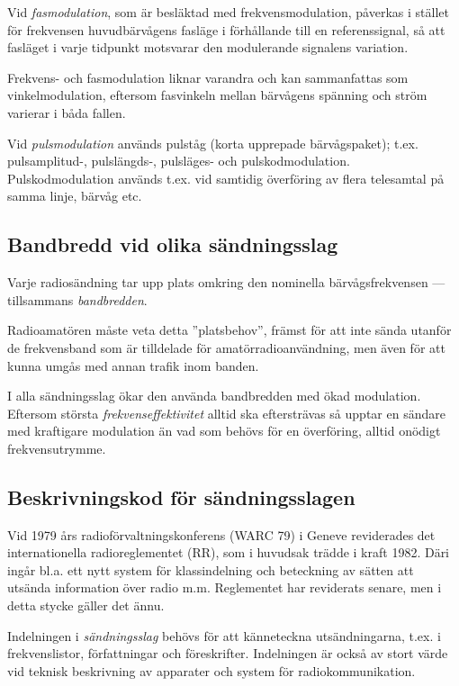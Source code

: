 Vid \emph{fasmodulation}, som är besläktad med frekvensmodulation, påverkas i
stället för frekvensen huvudbärvågens fasläge i förhållande till en
referenssignal, så att fasläget i varje tidpunkt motsvarar den modulerande
signalens variation.

Frekvens- och fasmodulation liknar varandra och kan sammanfattas som
vinkelmodulation, eftersom fasvinkeln mellan bärvågens spänning och ström
varierar i båda fallen.

Vid \emph{pulsmodulation} används pulståg (korta upprepade bärvågspaket); t.ex.
pulsamplitud-, pulslängds-, pulsläges- och pulskodmodulation.
Pulskodmodulation används t.ex. vid samtidig överföring av flera telesamtal på
samma linje, bärvåg etc.

\subsection{Bandbredd vid olika sändningsslag}

Varje radiosändning tar upp plats omkring den nominella bärvågsfrekvensen ---
tillsammans \emph{bandbredden}.

Radioamatören måste veta detta ''platsbehov'', främst för att inte sända utanför
de frekvensband som är tilldelade för amatörradioanvändning, men även för att
kunna umgås med annan trafik inom banden.

I alla sändningsslag ökar den använda bandbredden med ökad modulation.
Eftersom största \emph{frekvenseffektivitet} alltid ska eftersträvas så upptar
en sändare med kraftigare modulation än vad som behövs för en överföring, alltid
onödigt frekvensutrymme.

\subsection{Beskrivningskod för sändningsslagen}

Vid 1979 års radioförvaltningskonferens (WARC 79) i Geneve reviderades det
internationella radioreglementet (RR), som i huvudsak trädde i kraft 1982.
Däri ingår bl.a. ett nytt system för klassindelning och beteckning av sätten
att utsända information över radio m.m.
Reglementet har reviderats senare, men i detta stycke gäller det ännu.

Indelningen i \emph{sändningsslag} behövs för att känneteckna utsändningarna,
t.ex. i frekvenslistor, författningar och föreskrifter.
Indelningen är också av stort värde vid teknisk beskrivning av apparater och
system för radiokommunikation.

